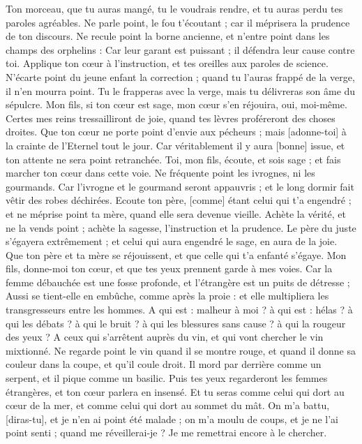 \begin{multicols}{2}
Ton morceau, que tu auras mangé, tu le voudrais rendre, et tu auras perdu tes paroles agréables.
Ne parle point, le fou t'écoutant ; car il méprisera la prudence de ton discours.
Ne recule point la borne ancienne, et n'entre point dans les champs des orphelins :
Car leur garant est puissant ; il défendra leur cause contre toi.
Applique ton cœur à l'instruction, et tes oreilles aux paroles de science.
N'écarte point du jeune enfant la correction ; quand tu l'auras frappé de la verge, il n'en mourra point.
Tu le frapperas avec la verge, mais tu délivreras son âme du sépulcre.
Mon fils, si ton cœur est sage, mon cœur s'en réjouira, oui, moi-même.
Certes mes reins tressailliront de joie, quand tes lèvres proféreront des choses droites.
Que ton cœur ne porte point d'envie aux pécheurs ; mais [adonne-toi] à la crainte de l'Eternel tout le jour.
Car véritablement il y aura [bonne] issue, et ton attente ne sera point retranchée.
Toi, mon fils, écoute, et sois sage ; et fais marcher ton cœur dans cette voie.
Ne fréquente point les ivrognes, ni les gourmands.
Car l'ivrogne et le gourmand seront appauvris ; et le long dormir fait vêtir des robes déchirées.
Ecoute ton père, [comme] étant celui qui t'a engendré ; et ne méprise point ta mère, quand elle sera devenue vieille.
Achète la vérité, et ne la vends point ; achète la sagesse, l'instruction et la prudence.
Le père du juste s'égayera extrêmement ; et celui qui aura engendré le sage, en aura de la joie.
Que ton père et ta mère se réjouissent, et que celle qui t'a enfanté s'égaye.
Mon fils, donne-moi ton cœur, et que tes yeux prennent garde à mes voies.
Car la femme débauchée est une fosse profonde, et l'étrangère est un puits de détresse ;
Aussi se tient-elle en embûche, comme après la proie : et elle multipliera les transgresseurs entre les hommes.
A qui est : malheur à moi ? à qui est : hélas ? à qui les débats ? à qui le bruit ? à qui les blessures sans cause ? à qui la rougeur des yeux ?
A ceux qui s'arrêtent auprès du vin, et qui vont chercher le vin mixtionné.
Ne regarde point le vin quand il se montre rouge, et quand il donne sa couleur dans la coupe, et qu'il coule droit.
Il mord par derrière comme un serpent, et il pique comme un basilic.
Puis tes yeux regarderont les femmes étrangères, et ton cœur parlera en insensé.
Et tu seras comme celui qui dort au cœur de la mer, et comme celui qui dort au sommet du mât.
On m'a battu, [diras-tu], et je n'en ai point été malade ; on m'a moulu de coups, et je ne l'ai point senti ; quand me réveillerai-je ? Je me remettrai encore à le chercher.

\end{multicols}

